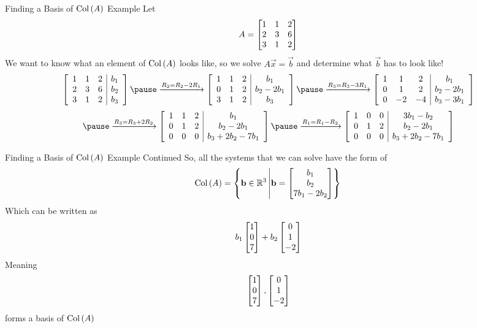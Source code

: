 \documentclass[xcoler=dvipsnames, aspectratio=169]{beamer}
\begin{document}
    \begin{frame}{Finding a Basis of $\mathrm{Col}\left(A\right)$ Example}
        \small
        Let 
        \[
            A = \begin{bmatrix}
                1 & 1 & 2\\
                2 & 3 & 6\\
                3 & 1 & 2
            \end{bmatrix}
        \]
        We want to know what an element of $\mathrm{Col}\left(A\right)$ looks like, so we solve
        $A\vec{x} = \vec{b}$ and determine what $\vec{b}$ has to look like!
        \[
            \aMat{ccc|c}{
                1 & 1 & 2 & b_1\\
                2 & 3 & 6 & b_2\\
                3 & 1 & 2 & b_3
            }\pause\xrightarrow{R_2=R_2-2R_1}\aMat{ccc|c}{
                1 & 1 & 2 & b_1\\
                0 & 1 & 2 & b_2-2b_1\\
                3 & 1 & 2 & b_3
            }\pause\xrightarrow{R_3=R_3-3R_1}\aMat{ccc|c}{
                1 & 1 & 2 & b_1\\
                0 & 1 & 2 & b_2-2b_1\\
                0 &-2 &-4 & b_3-3b_1
            }
        \]
        \[
            \pause\xrightarrow{R_3=R_3+2R_2}\aMat{ccc|c}{
                1 & 1 & 2 & b_1\\
                0 & 1 & 2 & b_2-2b_1\\
                0 & 0 & 0 & b_3+2b_2-7b_1
            }\pause\xrightarrow{R_1=R_1-R_2}\aMat{ccc|c}{
                1 & 0 & 0 & 3b_1-b_2\\
                0 & 1 & 2 & b_2-2b_1\\
                0 & 0 & 0 & b_3+2b_2-7b_1
            }
        \]
    \end{frame}
    \begin{frame}{Finding a Basis of $\mathrm{Col}\left(A\right)$ Example Continued}
        So, all the systems that we can solve have the form of
        \[
            \mathrm{Col}\left(A\right) = \left\{\mathbf{b}\in\mathbb{R}^3\left|\mathbf{b} = \begin{bmatrix}
                b_1\\
                b_2\\
                7b_1-2b_2
            \end{bmatrix}\right\}\right.
        \]
        Which can be written as\pause
        \[
            b_1\begin{bmatrix}1\\0\\7\end{bmatrix} + b_2\begin{bmatrix}0\\1\\-2\end{bmatrix}
        \]
        Meaning\pause
        \[
            \begin{bmatrix}1\\0\\7\end{bmatrix},\begin{bmatrix}0\\1\\-2\end{bmatrix}
        \]
        forms a basis of $\mathrm{Col}\left(A\right)$
    \end{frame}
\end{document}
